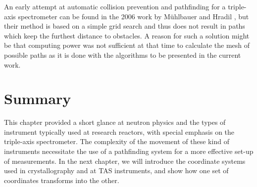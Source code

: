 An early attempt at automatic collision prevention and pathfinding for a triple-axis spectrometer can be found in
the 2006 work by M\"uhlbauer and Hradil \cite{Muehlbauer2006}, but their method is based on a simple grid search and thus
does not result in paths which keep the furthest distance to obstacles. A reason for such a solution might be
that computing power was not sufficient at that time to calculate the mesh of possible paths as it is 
done with the algorithms to be presented in the current work.



\section{Summary}

This chapter provided a short glance at neutron physics and the types of instrument typically used at research
reactors, with special emphasis on the triple-axis spectrometer. The complexity of the movement of these kind of
instruments necessitate the use of a pathfinding system for a more effective set-up of measurements.
In the next chapter, we will introduce the coordinate systems used in crystallography and at TAS instruments,
and show how one set of coordinates transforms into the other.
